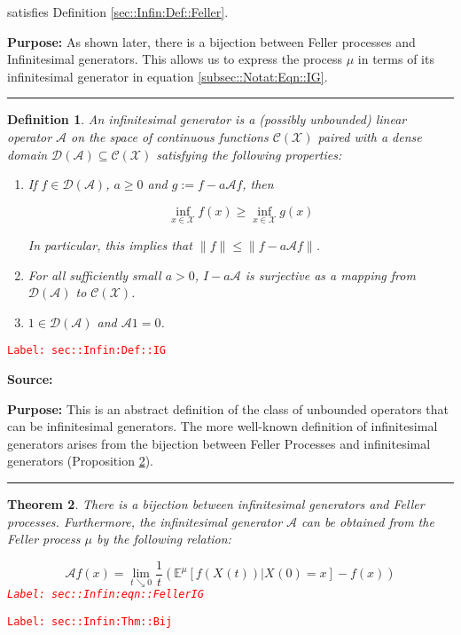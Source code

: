 \documentclass[12pt]{article}
\newcommand{\mb}{\mathbb}
\newcommand{\mc}{\mathcal}
\newcommand{\tr}{\textcolor{red}}
\newcommand{\labe}[1]{\tr{\texttt{Label: #1}}}
\newcommand{\purpose}{\textbf{Purpose: }}
\newcommand{\lin}{\rule{\linewidth}{0.4 pt}}
\newcommand{\exmu}[2]{\mb{E}^{#1}\left[#2\right]}	%
\newcommand{\x}{x}								%
\renewcommand{\t}{t}							%
\newcommand{\X}{X}								%
\newcommand{\IG}{\mc{A}}						%
\newcommand{\cind}[1]{_{#1}}					%
\newcommand{\tp}[1]{(#1)}						%
\newcommand{\core}{\mc{D}}						%
\newcommand{\cont}{\mc{C}}						%
\newcommand{\m}{\mu}							%
\newcommand{\spce}{\mc{X}}						%
\newtheorem{thms}{Theorem}[section]
\newtheorem{defn}[thms]{Definition}
\begin{document}
satisfies Definition \ref{sec::Infin:Def::Feller}.

\purpose As shown later, there is a bijection between Feller processes and Infinitesimal generators. This allows us to express the process \(\mu\) in terms of its infinitesimal generator in equation \eqref{subsec::Notat:Eqn::IG}.

\lin

\begin{defn}
An infinitesimal generator is a (possibly unbounded) linear operator \(\IG{}\) on the space of continuous functions \(\cont(\spce)\) paired with a dense domain \(\core(\IG{}) \subseteq \cont(\spce)\) satisfying the following properties:

\begin{enumerate}
\item If \(f \in \mc{D}(\IG{})\), \(a \geq 0\) and \(g:= f - a\IG{} f\), then 

\[\inf_{\x \in \spce} f(\x) \geq \inf_{\x \in \spce} g(\x)\]

\noindent In particular, this implies that \(\|f\| \leq \|f - a\IG{} f\|\).

\item For all sufficiently small \(a > 0\), \(I - a\IG{}\) is surjective as a mapping from \(\mc{D}(\IG{})\) to \(\cont(\spce)\).

\item \(1 \in \core(\IG{})\) and \(\IG{} 1 = 0\).
\end{enumerate}
\label{sec::Infin:Def::IG}
\end{defn}
\labe{sec::Infin:Def::IG}

\textbf{Source: }\cite[Definitions 2.1,2.7]{Lig85}

\purpose This is an abstract definition of the class of unbounded operators that can be infinitesimal generators. The more well-known definition of infinitesimal generators arises from the bijection between Feller Processes and infinitesimal generators (Proposition \ref{sec::Infin:Thm::Bij}).

\lin

\begin{thms}
There is a bijection between infinitesimal generators and Feller processes. Furthermore, the infinitesimal generator \(\IG{}\) can be obtained from the Feller process \(\m\) by the following relation:

\begin{equation}
\IG f(\x) = \lim_{\t\searrow 0} \frac{1}{\t}\left(\exmu{\m}{f(\X\cind{}\tp{\t})|\X\cind{}\tp{0}=\x} - f(\x)\right)
\label{sec::Infin:eqn::FellerIG}
\end{equation}
\labe{sec::Infin:eqn::FellerIG}
\label{sec::Infin:Thm::Bij}
\end{thms}
\labe{sec::Infin:Thm::Bij}
\end{document}
